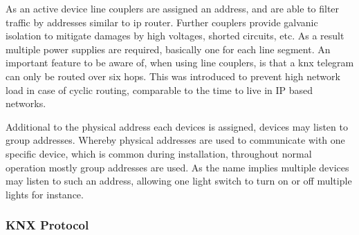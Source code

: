 As an active device line couplers are assigned an address, and are able to filter traffic by addresses similar to \gls{ip} router. %
Further couplers provide galvanic isolation to mitigate damages by high voltages, shorted circuits, etc. As a result multiple power supplies are required, basically one for each line segment.
An important feature to be aware of, when using line couplers, is that a \gls{knx} telegram can only be routed over six hops. This was introduced to prevent high network load in case of cyclic routing, comparable to the time to live in IP based networks. \parencite{Sokollik2017}



Additional to the physical address each devices is assigned, devices may listen to group addresses.
Whereby physical addresses are used to communicate with one specific device, which is common during installation, throughout normal operation mostly group addresses are used. As the name implies multiple devices may listen to such an address, allowing one light switch to turn on or off multiple lights for instance.

\subsubsection{KNX Protocol}
\label{sec:background:bas:knx:proto}

